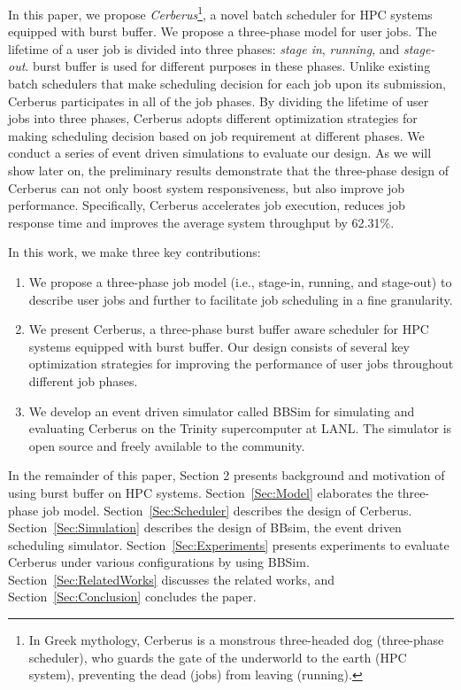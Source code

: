 In this paper, we propose \textit{Cerberus}\footnote{In Greek mythology,
Cerberus is a monstrous three-headed dog (three-phase scheduler),
who guards the gate of the underworld to the earth (HPC system),
preventing the dead (jobs) from leaving (running).},
a novel batch scheduler for HPC systems equipped with burst buffer. 
We propose a three-phase model for user jobs. 
The lifetime of a user job is divided into three phases:
\textit{stage in}, \textit{running}, and \textit{stage-out}.
burst buffer is used for different purposes in these phases.
Unlike existing batch schedulers that make scheduling decision for each job upon its submission,
Cerberus participates in all of the job phases.
By dividing the lifetime of user jobs into three phases,
Cerberus adopts different optimization strategies for 
making scheduling decision based on job requirement at different phases. 
We conduct a series of event driven simulations to evaluate our design. 
As we will show later on, 
the preliminary results demonstrate that the three-phase design of Cerberus 
can not only boost system responsiveness, but also improve job performance. 
Specifically,
Cerberus accelerates job execution, reduces job response time 
and improves the average system throughput by 62.31\%.


In this work, we make three key contributions: 
\begin{enumerate}
        \item    We propose a three-phase job model (i.e., stage-in, running, and stage-out) 
        to describe user jobs and further to facilitate job scheduling in a fine granularity.
        
        \item    We present Cerberus, 
        a three-phase burst buffer aware scheduler for HPC systems equipped with burst buffer. 
        Our design consists of several key optimization strategies for 
        improving the performance of user jobs throughout different job phases.
        
        \item    We develop an event driven simulator called BBSim 
        for simulating and evaluating Cerberus on the Trinity 
        supercomputer at LANL\cite{TrinitySystem}. 
        The simulator is open source and freely available to the community\cite{bbsim-github}.
\end{enumerate}


In the remainder of this paper, Section 2 presents background and 
motivation of using burst buffer on HPC systems.
Section~\ref{Sec:Model} elaborates the three-phase job model.
Section~\ref{Sec:Scheduler} describes the design of Cerberus.
Section~\ref{Sec:Simulation} describes the design of BBsim, the event driven scheduling simulator.
Section~\ref{Sec:Experiments} presents experiments to evaluate Cerberus under various configurations by using BBSim.
Section~\ref{Sec:RelatedWorks} discusses the related works, 
and Section~\ref{Sec:Conclusion} concludes the paper.


